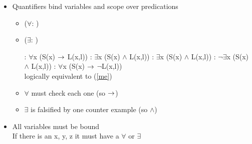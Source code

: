 \documentclass[a4paper,landscape,headrule,footrule,xetex]{foils}
\begin{document}
\begin{itemize}\addtolength{\itemsep}{-1ex}
  \item Quantifiers bind variables and scope over predications
    \begin{itemize}
    \item {} ($\forall$: )
    \item {} ($\exists$: )
    \begin{exe}
      \ex {}: $\forall$x (S(x)  $\rightarrow$ L(x,l))
      \ex {}: $\exists$x (S(x)  $\wedge$ L(x,l))
      \ex {}: $\exists$x (S(x)  $\wedge$ L(x,l))
      \ex\label{me} : $\neg\exists$x (S(x)  $\wedge$ L(x,l))
      \ex {}: $\forall$x (S(x)  $\rightarrow$ $\neg$L(x,l))
      \\ logically equivalent to (\ref{me})
    \end{exe}
  \item $\forall$ must check each one (so $\rightarrow$)
  \item $\exists$ is falsified by one counter example  (so $\wedge$)
    \end{itemize}

  \item All variables must be bound \\
    If there is an x, y, z it must have a $\forall$ or $\exists$
\end{itemize}

\end{document}
